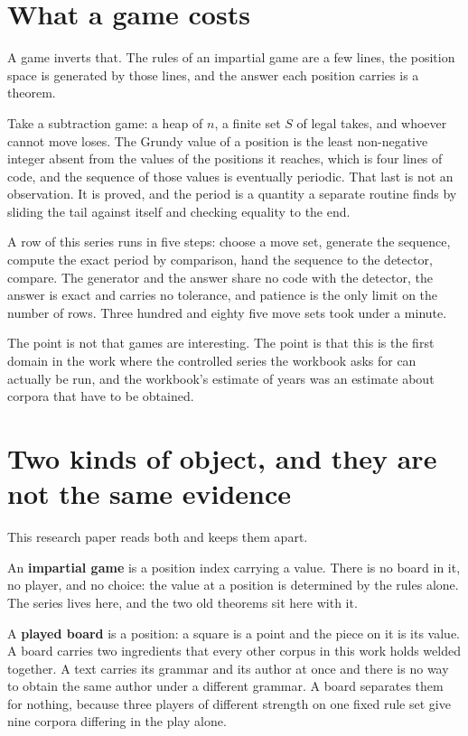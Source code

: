 \section{What a game costs}

A game inverts that. The rules of an impartial game are a few lines, the position space is generated
by those lines, and the answer each position carries is a theorem.

Take a subtraction game: a heap of \(n\), a finite set \(S\) of legal takes, and whoever cannot move
loses. The Grundy value of a position is the least non-negative integer absent from the values of
the positions it reaches, which is four lines of code, and the sequence of those values is
eventually periodic. That last is not an observation. It is proved, and the period is a quantity a
separate routine finds by sliding the tail against itself and checking equality to the end.

A row of this series runs in five steps: choose a move set, generate the sequence, compute the
exact period by comparison, hand the sequence to the detector, compare. The generator and the answer
share no code with the detector, the answer is exact and carries no tolerance, and patience is the
only limit on the number of rows. Three hundred and eighty five move sets took under a minute.

The point is not that games are interesting. The point is that this is the first domain in the work
where the controlled series the workbook asks for can actually be run, and the workbook's estimate
of years was an estimate about corpora that have to be obtained.

\section{Two kinds of object, and they are not the same evidence}

This research paper reads both and keeps them apart.

An \textbf{impartial game} is a position index carrying a value. There is no board in it, no player,
and no choice: the value at a position is determined by the rules alone. The series lives here, and
the two old theorems sit here with it.

A \textbf{played board} is a position: a square is a point and the piece on it is its value. A board
carries two ingredients that every other corpus in this work holds welded together. A text carries
its grammar and its author at once and there is no way to obtain the same author under a different
grammar. A board separates them for nothing, because three players of different strength on one
fixed rule set give nine corpora differing in the play alone.

